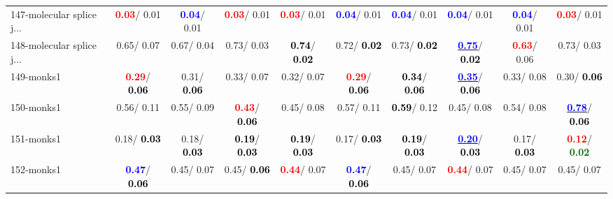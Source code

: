 \begin{table}[h]
\begin{center}
{\begin{tabular}{lc|c|c|c|c|c|c|c|c}
147-molecular splice j... & \textcolor{red}{\textbf{  0.03}}/  0.01 & \textcolor{blue}{\textbf{  0.04}}/  0.01 & \textcolor{red}{\textbf{  0.03}}/  0.01 & \textcolor{red}{\textbf{  0.03}}/  0.01 & \textcolor{blue}{\textbf{  0.04}}/  0.01 & \textcolor{blue}{\textbf{  0.04}}/  0.01 & \textcolor{blue}{\textbf{  0.04}}/  0.01 & \textcolor{blue}{\textbf{  0.04}}/  0.01 & \textcolor{red}{\textbf{  0.03}}/  0.01 \\
148-molecular splice j... &   0.65/  0.07 &   0.67/  0.04 &   0.73/  0.03 & \textcolor{black}{\textbf{  0.74}}/\textcolor{black}{\textbf{  0.02}} &   0.72/\textcolor{black}{\textbf{  0.02}} &   0.73/\textcolor{black}{\textbf{  0.02}} & \underline{\textcolor{blue}{\textbf{  0.75}}}/\textcolor{black}{\textbf{  0.02}} & \textcolor{red}{\textbf{  0.63}}/  0.06 &   0.73/  0.03 \\
149-monks1 & \textcolor{red}{\textbf{  0.29}}/\textcolor{black}{\textbf{  0.06}} &   0.31/\textcolor{black}{\textbf{  0.06}} &   0.33/  0.07 &   0.32/  0.07 & \textcolor{red}{\textbf{  0.29}}/\textcolor{black}{\textbf{  0.06}} & \textcolor{black}{\textbf{  0.34}}/\textcolor{black}{\textbf{  0.06}} & \underline{\textcolor{blue}{\textbf{  0.35}}}/\textcolor{black}{\textbf{  0.06}} &   0.33/  0.08 &   0.30/\textcolor{black}{\textbf{  0.06}} \\ \hline
150-monks1 &   0.56/  0.11 &   0.55/  0.09 & \textcolor{red}{\textbf{  0.43}}/\textcolor{black}{\textbf{  0.06}} &   0.45/  0.08 &   0.57/  0.11 & \textcolor{black}{\textbf{  0.59}}/  0.12 &   0.45/  0.08 &   0.54/  0.08 & \underline{\textcolor{blue}{\textbf{  0.78}}}/\textcolor{black}{\textbf{  0.06}} \\
151-monks1 &   0.18/\textcolor{black}{\textbf{  0.03}} &   0.18/\textcolor{black}{\textbf{  0.03}} & \textcolor{black}{\textbf{  0.19}}/\textcolor{black}{\textbf{  0.03}} & \textcolor{black}{\textbf{  0.19}}/\textcolor{black}{\textbf{  0.03}} &   0.17/\textcolor{black}{\textbf{  0.03}} & \textcolor{black}{\textbf{  0.19}}/\textcolor{black}{\textbf{  0.03}} & \underline{\textcolor{blue}{\textbf{  0.20}}}/\textcolor{black}{\textbf{  0.03}} &   0.17/\textcolor{black}{\textbf{  0.03}} & \textcolor{red}{\textbf{  0.12}}/\textcolor{darkgreen}{\textbf{  0.02}} \\
152-monks1 & \textcolor{blue}{\textbf{  0.47}}/\textcolor{black}{\textbf{  0.06}} &   0.45/  0.07 &   0.45/\textcolor{black}{\textbf{  0.06}} & \textcolor{red}{\textbf{  0.44}}/  0.07 & \textcolor{blue}{\textbf{  0.47}}/\textcolor{black}{\textbf{  0.06}} &   0.45/  0.07 & \textcolor{red}{\textbf{  0.44}}/  0.07 &   0.45/  0.07 &   0.45/  0.07 \\

\end{tabular}}
\end{center}
\end{table}
